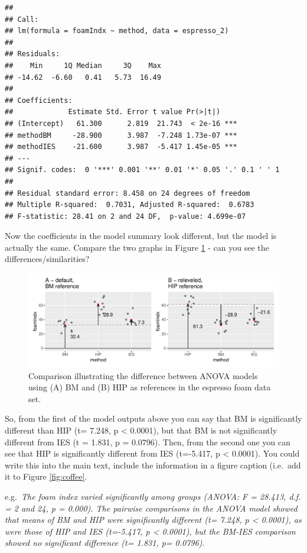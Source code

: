 \documentclass[
  a4paperpaper,
]{book}
\begin{document}
\begin{verbatim}
## 
## Call:
## lm(formula = foamIndx ~ method, data = espresso_2)
## 
## Residuals:
##    Min     1Q Median     3Q    Max 
## -14.62  -6.60   0.41   5.73  16.49 
## 
## Coefficients:
##             Estimate Std. Error t value Pr(>|t|)    
## (Intercept)   61.300      2.819  21.743  < 2e-16 ***
## methodBM     -28.900      3.987  -7.248 1.73e-07 ***
## methodIES    -21.600      3.987  -5.417 1.45e-05 ***
## ---
## Signif. codes:  0 '***' 0.001 '**' 0.01 '*' 0.05 '.' 0.1 ' ' 1
## 
## Residual standard error: 8.458 on 24 degrees of freedom
## Multiple R-squared:  0.7031,	Adjusted R-squared:  0.6783 
## F-statistic: 28.41 on 2 and 24 DF,  p-value: 4.699e-07
\end{verbatim}

Now the coefficients in the model summary look different, but the model is actually the same. Compare the two graphs in Figure \ref{fig:differentReferences} - can you see the differences/similarities?

\begin{figure}

{\centering \includegraphics{BB852_files/figure-latex/differentReferences-1} 

}

\caption{Comparison illustrating the difference between ANOVA models using (A) BM and (B) HIP as references in the espresso foam data set.}\label{fig:differentReferences}
\end{figure}

So, from the first of the model outputs above you can say that BM is significantly different than HIP (t= 7.248, p \textless{} 0.0001), but that BM is not significantly different from IES (t = 1.831, p = 0.0796). Then, from the second one you can see that HIP is significantly different from IES (t=-5.417, p \textless{} 0.0001). You could write this into the main text, include the information in a figure caption (i.e.~add it to Figure \ref{fig:coffee}.

e.g.~\emph{The foam index varied significantly among groups (ANOVA: F = 28.413, d.f. = 2 and 24, p = 0.000). The pairwise comparisons in the ANOVA model showed that means of BM and HIP were significantly different (t= 7.248, p \textless{} 0.0001), as were those of HIP and IES (t=-5.417, p \textless{} 0.0001), but the BM-IES comparison showed no significant difference (t= 1.831, p= 0.0796)}.
\end{document}
